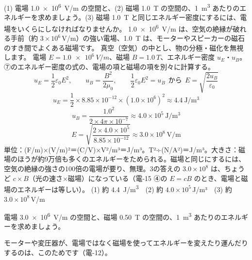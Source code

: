 \begin{phreidai}
\label{ph:電-14:ex4}(1) 電場 \qty{1.0e6}{V/m} の空間と、(2) 磁場 \qty{1.0}{T} の空間の、\qty{1}{m^3} あたりのエネルギーを求めましょう。(3) 磁場 \qty{1.0}{T} と同じエネルギー密度にするには、電場をいくらにしなければなりませんか。
\phbamen
\qty{1.0e6}{V/m} は、空気の絶縁が破れる手前（約 $3\times10^6$\,V/m）の強い電場、\qty{1.0}{T} は、モーターやスピーカーの磁石のすき間でよくある磁場です。
\phmushi
真空（空気）の中とし、物の分極・磁化を無視します。
\phzu
電場 $E=\qty{1.0e6}{V/m}$、磁場 $B=\qty{1.0}{T}$、エネルギー密度 $u_E$・$u_B$。
\phriyu
⑦のエネルギー密度の式の、電場の項と磁場の項を別々に計算する。
\phtateru
\[ u_E=\frac12\varepsilon_0E^2,\qquad u_B=\frac{B^2}{2\mu_0},\qquad \frac12\varepsilon_0E^2=u_B\ \ \text{から}\ \ E=\sqrt{\frac{2u_B}{\varepsilon_0}} \]
\phtoku
\[ u_E=\frac12\times8.85\times10^{-12}\times(1.0\times10^6)^2\approx4.4\ \mathrm{J/m^3} \]
\[ u_B=\frac{1.0^2}{2\times4\pi\times10^{-7}}\approx4.0\times10^5\ \mathrm{J/m^3} \]
\[ E=\sqrt{\frac{2\times4.0\times10^5}{8.85\times10^{-12}}}\approx3.0\times10^8\ \mathrm{V/m} \]
\phtashikame
単位：(F/m)×(V/m)²＝(C/V)×V²/m³＝J/m³。T²÷(N/A²)＝J/m³。大きさ：磁場のほうが約9万倍も多くのエネルギーをためられる。磁場と同じにするには、空気の絶縁の強さの100倍の電場が要り、無理。3の答えの $3.0\times10^8$ は、ちょうど $c\times B$（光の速さ×磁場）になっている（電-15 ④の $E=cB$ のとき、電場と磁場のエネルギーは等しい）。
\kotae (1) 約 \qty{4.4}{J/m^3}　(2) 約 $4.0\times10^5$\,J/m³　(3) 約 $3.0\times10^8$\,V/m
\end{phreidai}
\begin{jibun}
電場 \qty{3.0e6}{V/m} の空間と、磁場 \qty{0.50}{T} の空間の、\qty{1}{m^3} あたりのエネルギーを求めましょう。
\end{jibun}

\noindent モーターや変圧器が、電場ではなく磁場を使ってエネルギーを変えたり運んだりするのは、このためです（電-12）。

